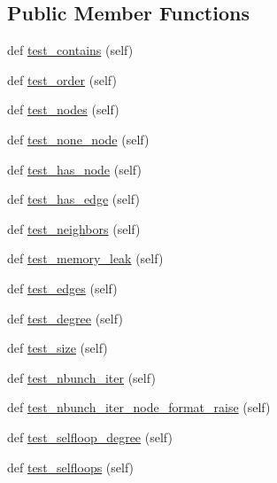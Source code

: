 \subsection*{Public Member Functions}
\begin{DoxyCompactItemize}
\item 
def \hyperlink{classnetworkx_1_1classes_1_1tests_1_1test__graph_1_1BaseGraphTester_a52498b6e6bb6c0c52eb479c83e56062c}{test\+\_\+contains} (self)
\item 
def \hyperlink{classnetworkx_1_1classes_1_1tests_1_1test__graph_1_1BaseGraphTester_a8ba1ec82be94323ac6aac6fb71e7594d}{test\+\_\+order} (self)
\item 
def \hyperlink{classnetworkx_1_1classes_1_1tests_1_1test__graph_1_1BaseGraphTester_ab76bb7624d02723c8b76c43311e0030d}{test\+\_\+nodes} (self)
\item 
def \hyperlink{classnetworkx_1_1classes_1_1tests_1_1test__graph_1_1BaseGraphTester_ae51f92f54ea0c156ad323bf6e11d4399}{test\+\_\+none\+\_\+node} (self)
\item 
def \hyperlink{classnetworkx_1_1classes_1_1tests_1_1test__graph_1_1BaseGraphTester_a8d72be7118dca70890c700e5ca0677cf}{test\+\_\+has\+\_\+node} (self)
\item 
def \hyperlink{classnetworkx_1_1classes_1_1tests_1_1test__graph_1_1BaseGraphTester_ac3adffb2b311d6a82309c65ddbfe7097}{test\+\_\+has\+\_\+edge} (self)
\item 
def \hyperlink{classnetworkx_1_1classes_1_1tests_1_1test__graph_1_1BaseGraphTester_a90b4e6e5136952cc756a2e6a6eaac6de}{test\+\_\+neighbors} (self)
\item 
def \hyperlink{classnetworkx_1_1classes_1_1tests_1_1test__graph_1_1BaseGraphTester_ab4f0382f5112b4793a69f7759e5b628a}{test\+\_\+memory\+\_\+leak} (self)
\item 
def \hyperlink{classnetworkx_1_1classes_1_1tests_1_1test__graph_1_1BaseGraphTester_aaa7e102343e25456dc5b013a6c4ba247}{test\+\_\+edges} (self)
\item 
def \hyperlink{classnetworkx_1_1classes_1_1tests_1_1test__graph_1_1BaseGraphTester_a726a074ec8d5164dbd25278b25bfb700}{test\+\_\+degree} (self)
\item 
def \hyperlink{classnetworkx_1_1classes_1_1tests_1_1test__graph_1_1BaseGraphTester_a35ae964f21191469e4e964c7640b85da}{test\+\_\+size} (self)
\item 
def \hyperlink{classnetworkx_1_1classes_1_1tests_1_1test__graph_1_1BaseGraphTester_a277ad54ea04fa9c1f7940a986025bc8a}{test\+\_\+nbunch\+\_\+iter} (self)
\item 
def \hyperlink{classnetworkx_1_1classes_1_1tests_1_1test__graph_1_1BaseGraphTester_a40af74e9095bc7e886fb68f7175c7fe3}{test\+\_\+nbunch\+\_\+iter\+\_\+node\+\_\+format\+\_\+raise} (self)
\item 
def \hyperlink{classnetworkx_1_1classes_1_1tests_1_1test__graph_1_1BaseGraphTester_a040af4d34fbf6d456936335ebf5e2259}{test\+\_\+selfloop\+\_\+degree} (self)
\item 
def \hyperlink{classnetworkx_1_1classes_1_1tests_1_1test__graph_1_1BaseGraphTester_a7b61db3b4acdc6f7d16debfc05df0038}{test\+\_\+selfloops} (self)
\end{DoxyCompactItemize}
